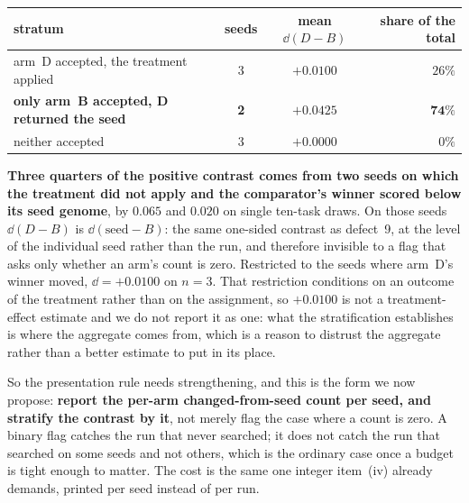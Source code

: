 \documentclass[11pt]{article}
\begin{document}
\begin{center}\small
\begin{tabular}{lccr}
\toprule
stratum & seeds & mean $\dd(D-B)$ & share of the total \\
\midrule
arm~D accepted, the treatment applied & 3 & $+0.0100$ & $26\%$ \\
\textbf{only arm~B accepted, D returned the seed} & \textbf{2} & $\mathbf{+0.0425}$ & $\mathbf{74\%}$ \\
neither accepted & 3 & $+0.0000$ & $0\%$ \\
\bottomrule
\end{tabular}
\end{center}

\noindent
\textbf{Three quarters of the positive contrast comes from two seeds on which the treatment did not
apply and the comparator's winner scored below its seed genome}, by $0.065$ and $0.020$ on
single ten-task draws.
On those seeds $\dd(D-B)$ is $\dd(\mathrm{seed}-B)$: the same one-sided contrast as
defect~9, at the level of the individual seed rather than the run, and therefore invisible to a
flag that asks only whether an arm's count is zero. Restricted to the seeds where arm~D's winner
moved, $\dd = +0.0100$ on $n = 3$. That restriction conditions on an outcome of the treatment
rather than on the assignment, so $+0.0100$ is not a treatment-effect estimate and we do not
report it as one: what the stratification establishes is where the aggregate comes from, which
is a reason to distrust the aggregate rather than a better estimate to put in its place.

So the presentation rule needs strengthening, and this is the form we now propose: \textbf{report
the per-arm changed-from-seed count per seed, and stratify the contrast by it}, not merely flag the
case where a count is zero. A binary flag catches the run that never searched; it does not catch
the run that searched on some seeds and not others, which is the ordinary case once a budget is
tight enough to matter. The cost is the same one integer item~(iv) already demands, printed per
seed instead of per run.
\end{document}
